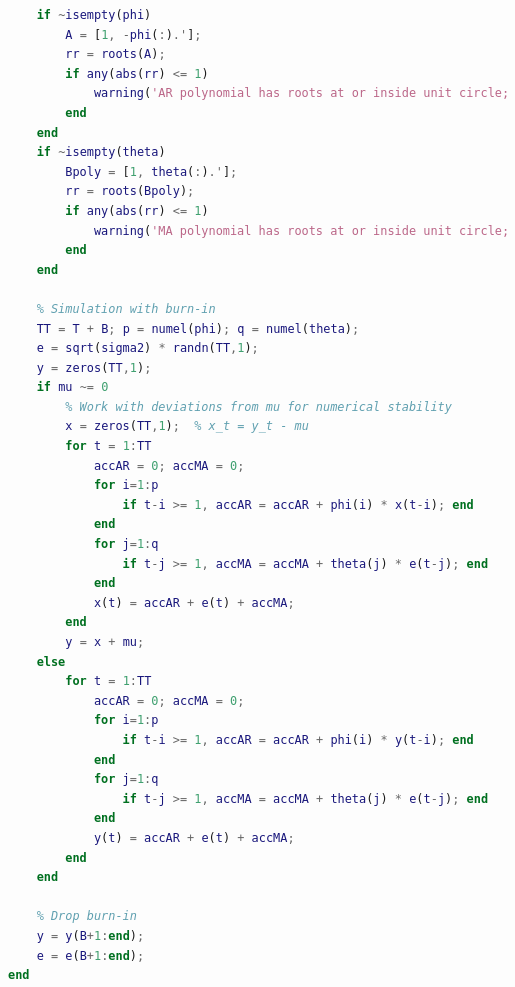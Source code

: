 \documentclass[dvipsnames,11pt]{article}
\begin{document}
\begin{solution}
\begin{lstlisting}[language=Matlab]
    % Sanity: warn if (approx) nonstationary / noninvertible
    if ~isempty(phi)
        A = [1, -phi(:).'];
        rr = roots(A);
        if any(abs(rr) <= 1)
            warning('AR polynomial has roots at or inside unit circle; process may be nonstationary.');
        end
    end
    if ~isempty(theta)
        Bpoly = [1, theta(:).'];
        rr = roots(Bpoly);
        if any(abs(rr) <= 1)
            warning('MA polynomial has roots at or inside unit circle; process may be noninvertible.');
        end
    end

    % Simulation with burn-in
    TT = T + B; p = numel(phi); q = numel(theta);
    e = sqrt(sigma2) * randn(TT,1);
    y = zeros(TT,1);
    if mu ~= 0
        % Work with deviations from mu for numerical stability
        x = zeros(TT,1);  % x_t = y_t - mu
        for t = 1:TT
            accAR = 0; accMA = 0;
            for i=1:p
                if t-i >= 1, accAR = accAR + phi(i) * x(t-i); end
            end
            for j=1:q
                if t-j >= 1, accMA = accMA + theta(j) * e(t-j); end
            end
            x(t) = accAR + e(t) + accMA;
        end
        y = x + mu;
    else
        for t = 1:TT
            accAR = 0; accMA = 0;
            for i=1:p
                if t-i >= 1, accAR = accAR + phi(i) * y(t-i); end
            end
            for j=1:q
                if t-j >= 1, accMA = accMA + theta(j) * e(t-j); end
            end
            y(t) = accAR + e(t) + accMA;
        end
    end

    % Drop burn-in
    y = y(B+1:end);
    e = e(B+1:end);
end
\end{lstlisting}
        
    \end{solution}
\end{document}

